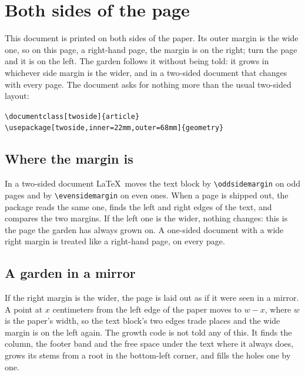 \documentclass[11pt,a4paper,twoside]{article}
\newcommand\code[1]{\texttt{\small #1}}
\theoremstyle{definition}
\begin{document}
\section{Both sides of the page}

This document is printed on both sides of the paper. Its outer margin is the wide one, so
on this page, a right-hand page, the margin is on the right; turn the page and it is on the
left. The garden follows it without being told: it grows in whichever side margin is the
wider, and in a two-sided document that changes with every page. The document asks for
nothing more than the usual two-sided layout:
\begin{center}\code{\textbackslash documentclass[twoside]\{article\}}\\
\code{\textbackslash usepackage[twoside,inner=22mm,outer=68mm]\{geometry\}}\end{center}

\subsection{Where the margin is}

In a two-sided document \LaTeX\ moves the text block by \code{\textbackslash oddsidemargin}
on odd pages and by \code{\textbackslash evensidemargin} on even ones. When a page is
shipped out, the package reads the same one, finds the left and right edges of the text,
and compares the two margins. If the left one is the wider, nothing changes: this is the
page the garden has always grown on. A one-sided document with a wide right margin is
treated like a right-hand page, on every page.

\subsection{A garden in a mirror}

If the right margin is the wider, the page is laid out as if it were seen in a mirror. A
point at $x$ centimeters from the left edge of the paper moves to $w - x$, where $w$ is the
paper's width, so the text block's two edges trade places and the wide margin is on the
left again. The growth code is not told any of this. It finds the column, the footer band
and the free space under the text where it always does, grows its stems from a root in the
bottom-left corner, and fills the holes one by one.
\end{document}
